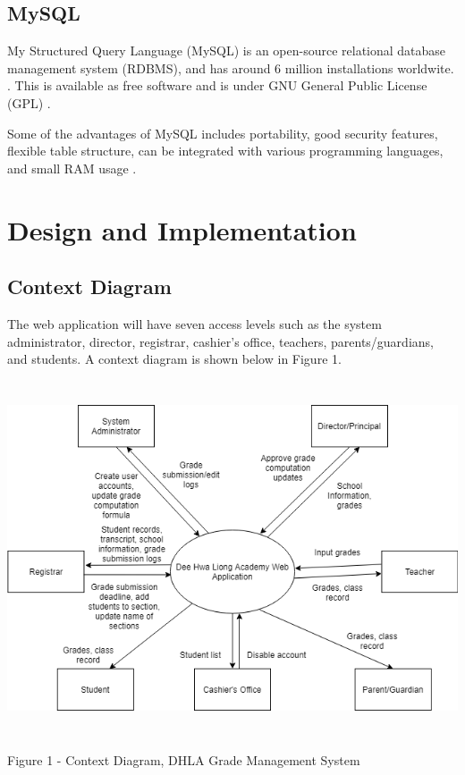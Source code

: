 \documentclass[11pt,a4paper,titlepage]{article}
\let\stdsection\section
\renewcommand\section{\newpage\stdsection}
\begin{document}
\subsection{MySQL}

My Structured Query Language (MySQL) is an open-source relational database management system (RDBMS), and has around 6 million installations worldwite. \cite{DBEngines}. This is available as free software and is under GNU General Public License (GPL) \cite{mySQL}.

Some of the advantages of MySQL includes portability, good security features, flexible table structure, can be integrated with various programming languages, and small RAM usage \cite{mySQL}.  

\section{Design and Implementation}

\subsection{Context Diagram}

The web application will have seven access levels such as the system administrator, director, registrar, cashier's office, teachers, parents/guardians, and students. A context diagram is shown below in Figure 1.

\vspace{2cm}
\begin{center}
\includegraphics[height=10.5cm]{Context-Diagram.png}
\end{center}
\vspace{2cm}
\begin{center}
    Figure 1 - Context Diagram, DHLA Grade Management System
\end{center}
\end{document}
